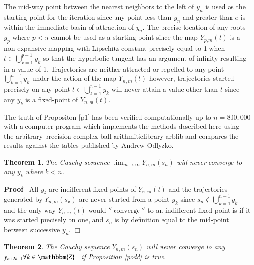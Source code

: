 \documentclass{elsarticle}
\newcommand{\nin}{\not\in}
\newcommand{\tmop}[1]{\ensuremath{\operatorname{#1}}}
\newenvironment{proof}{\noindent\textbf{Proof\ }}{\hspace*{\fill}$\Box$\medskip}
\newtheorem{theorem}{Theorem}
\begin{document}
\begin{remark}
  The mid-way point between the nearest neighbors to the left of $y_n$ is used
  as the starting point for the iteration since any point less than $y_n$ and
  greater than $e$ is within the immediate basin of attraction of $y_n$. The
  precise location of any roots $y_p$ where $p < n$ cannot be used as a
  starting point since the map $Y_{p, m} (t)$ is a non-expansive mapping with
  Lipschitz constant precisely equal to 1 when $t \in \bigcup^{p - 1}_{k = 1}
  y_k$ so that the hyperbolic tangent has an argument of infinity resulting in
  a value of 1. Trajectories are neither attracted or repelled to any point
  $\bigcup^{n - 1}_{k = 1} y_k$ under the action of the map $Y_{n, m} (t)$
  however, trajectories started precisely on any point $t \in \bigcup^{n -
  1}_{k = 1} y_k$ will never attain a value other than $t$ since any $y_k$ is
  a fixed-point of $Y_{n, m} (t)$. 
\end{remark}

\begin{note}
  The truth of Propositon \ref{p1} has been verified computationally up to $n
  = 800, 000$ with a computer program which implements the methods described
  here using the arbitrary precision complex ball arithmiticlibrary
  arblib{\cite{Johansson2013arb}} and compares the results against the tables
  published by Andrew Odlyzko{\cite{zt}}. 
\end{note}

\begin{theorem}
  The Cauchy sequence $\lim_{m \rightarrow \infty} Y_{n, m} (s_n)$ will never
  converge to any $y_k$ where $k < n$. 
\end{theorem}

\begin{proof}
  All $y_k$ are indifferent fixed-points of $Y_{n, m} (t)$ and the
  trajectories generated by $Y_{n, m} (s_n)$ are never started from a point
  $y_k$ since $s_n \nin \bigcup_{k = 1}^{n - 1} y_k$ and the only way $Y_{n,
  m} (t)$ would $'' \tmop{converge}''$ to an indifferent fixed-point is if it
  was started precisely on one, and $s_n$ is by definition equal to the
  mid-point between successive $y_n$.
\end{proof}

\begin{theorem}
  \label{pc}The Cauchy sequence $Y_{n, m} (s_n)$ will never converge to any
  $y_{n + 2 k - 1} \forall k \in \mathbbm{Z}^+$ if Proposition \ref{podd} is
  true.
\end{theorem}
\end{document}
